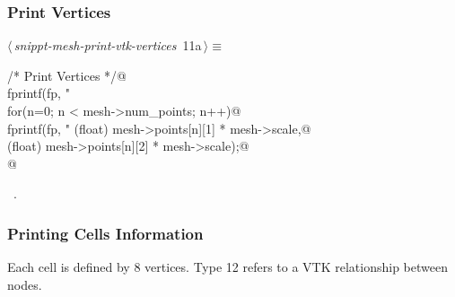 \documentclass[a4paper,11pt]{article}
\begin{document}
\subsubsection{Print Vertices}
\begin{flushleft} \small
\begin{minipage}{\linewidth}\label{scrap11}\raggedright\small
{} $\langle\,${\itshape snippt-mesh-print-vtk-vertices}\nobreak\ {\footnotesize {11a}}$\,\rangle\equiv$
\vspace{-1ex}
\begin{list}{}{} \item
\mbox{}\verb@/* Print Vertices */@\\
\mbox{}\verb@    fprintf(fp, "\nPOINTS %d FLOAT\n", mesh->num_points);@\\
\mbox{}\verb@@\\
\mbox{}\verb@    for(n=0; n < mesh->num_points; n++){@\\
\mbox{}\verb@        fprintf(fp, "%+e %+e %+e\n", (float) mesh->points[n][0] * mesh->scale,@\\
\mbox{}\verb@                                     (float) mesh->points[n][1] * mesh->scale,@\\
\mbox{}\verb@                                     (float) mesh->points[n][2] * mesh->scale);@\\
\mbox{}\verb@    }@\\
\mbox{}\verb@@{\NWsep}
\end{list}
\vspace{-1.5ex}
\footnotesize
\begin{list}{}{\setlength{\itemsep}{-\parsep}\setlength{\itemindent}{-\leftmargin}}
\item \NWtxtMacroRefIn\ .

\item{}
\end{list}
\end{minipage}\vspace{4ex}
\end{flushleft}
\subsubsection{Printing Cells Information}
Each cell is defined by 8 vertices. Type 12 refers to a VTK relationship between nodes.
\end{document}
